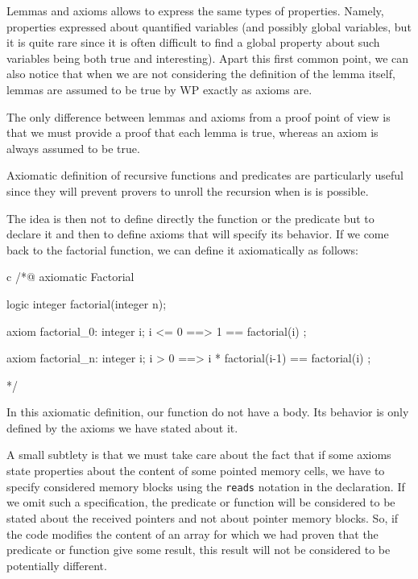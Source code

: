 


Lemmas and axioms allows to express the same types of properties.
Namely, properties expressed about quantified variables (and possibly
global variables, but it is quite rare since it is often difficult to
find a global property about such variables being both true and
interesting). Apart this first common point, we can also notice that
when we are not considering the definition of the lemma itself, lemmas
are assumed to be true by WP exactly as axioms are.




The only difference between lemmas and axioms from a proof point of view
is that we must provide a proof that each lemma is true, whereas an
axiom is always assumed to be true.





Axiomatic definition of recursive functions and predicates are
particularly useful since they will prevent provers to unroll the
recursion when is is possible.



The idea is then not to define directly the function or the predicate
but to declare it and then to define axioms that will specify its
behavior. If we come back to the factorial function, we can define it
axiomatically as follows:



\begin{CodeBlock}{c}
/*@
  axiomatic Factorial{
    logic integer factorial(integer n);
    
    axiom factorial_0:
      \forall integer i; i <= 0 ==> 1 == factorial(i) ;

    axiom factorial_n:
      \forall integer i; i > 0 ==> i * factorial(i-1) == factorial(i) ;
  }
*/
\end{CodeBlock}



In this axiomatic definition, our function do not have a body. Its
behavior is only defined by the axioms we have stated about it.



A small subtlety is that we must take care about the fact that if some
axioms state properties about the content of some pointed memory cells,
we have to specify considered memory blocks using the \texttt{reads}
notation in the declaration. If we omit such a specification, the
predicate or function will be considered to be stated about the received
pointers and not about pointer memory blocks. So, if the code modifies
the content of an array for which we had proven that the predicate or
function give some result, this result will not be considered to be
potentially different.




